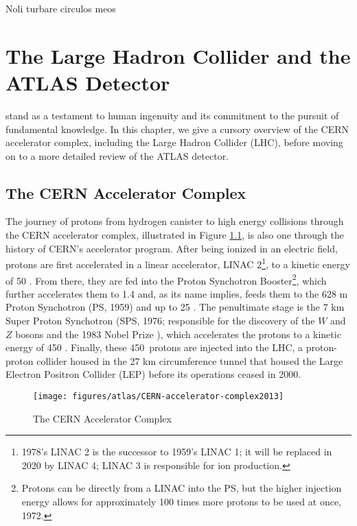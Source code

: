 \begin{savequote}[75mm]
Noli turbare circulos meos
\end{savequote}

\chapter{The Large Hadron Collider and the ATLAS Detector}
\label{ch:lhcatlas}
 stand as a testament to human ingenuity and its commitment to the pursuit of fundamental knowledge.  In this chapter, we give a cursory overview of the CERN accelerator complex, including the Large Hadron Collider (LHC), before moving on to a more detailed review of the ATLAS detector.

\section{The CERN Accelerator Complex}
The journey of protons from hydrogen canister to high energy collisions through the CERN accelerator complex, illustrated in Figure \ref{fig:cern}, is also one through the history of CERN's accelerator program.  After being ionized in an electric field, protons are first accelerated in a linear accelerator, LINAC 2\footnote{1978's LINAC 2 is the successor to 1959's LINAC 1; it will be replaced in 2020 by LINAC 4; LINAC 3 is responsible for ion production.}, to a kinetic energy of 50 \MeV.  From there, they are fed into the Proton Synchotron Booster\footnote{Protons can be directly from a LINAC into the PS, but the higher injection energy allows for approximately 100 times more protons to be used at once\cite{booster}, 1972.}, which further accelerates them to 1.4 \GeV and, as its name implies, feeds them to the 628 m Proton Synchotron (PS, 1959\cite{ps}) and up to 25 \GeV.  The penultimate stage is the 7 km Super Proton Synchotron (SPS, 1976; responsible for the discovery of the $W$ and $Z$ bosons and the 1983 Nobel Prize \cite{sps}), which accelerates the protons to a kinetic energy of 450 \GeV.  Finally, these 450 \GeV\,protons are injected into the LHC\cite{lhcjinst}, a proton-proton collider housed in the 27 km circumference tunnel that housed the Large Electron Positron Collider (LEP) before its operations ceased in 2000.  

\begin{figure}[!htbp]\captionsetup{justification=centering}
  \centering
  \texttt{[image: figures/atlas/CERN-accelerator-complex2013]}
  \caption{The CERN Accelerator Complex \cite{rings}}
  \label{fig:cern}
\end{figure}


